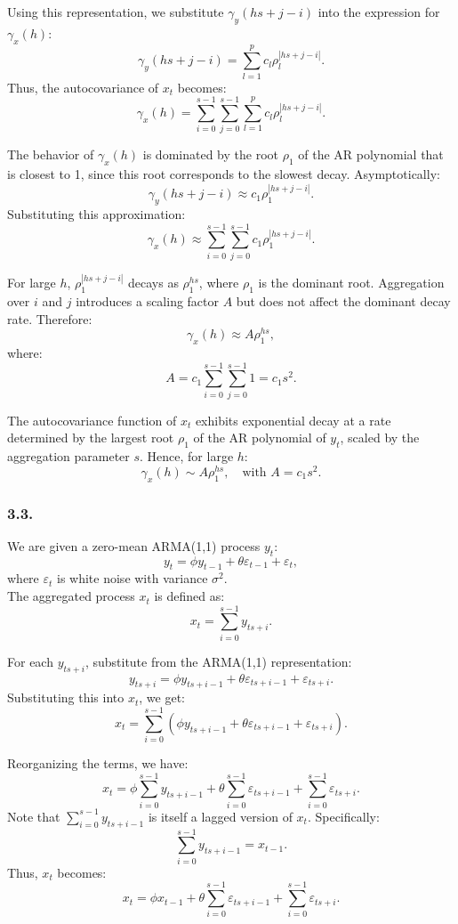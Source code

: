 \documentclass{article}
\begin{document}
Using this representation, we substitute \( \gamma_y(hs + j - i) \) into the expression for \( \gamma_x(h) \):
\[
\gamma_y(hs + j - i) = \sum_{l=1}^p c_l \rho_l^{|hs + j - i|}.
\]
Thus, the autocovariance of \( x_t \) becomes:
\[
\gamma_x(h) = \sum_{i=0}^{s-1}\sum_{j=0}^{s-1} \sum_{l=1}^p c_l \rho_l^{|hs + j - i|}.
\]


The behavior of \( \gamma_x(h) \) is dominated by the root \( \rho_1 \) of the AR polynomial that is closest to 1, since this root corresponds to the slowest decay. Asymptotically:
\[
\gamma_y(hs + j - i) \approx c_1 \rho_1^{|hs + j - i|}.
\]
Substituting this approximation:
\[
\gamma_x(h) \approx \sum_{i=0}^{s-1}\sum_{j=0}^{s-1} c_1 \rho_1^{|hs + j - i|}.
\]

For large \( h \), \( \rho_1^{|hs + j - i|} \) decays as \( \rho_1^{hs} \), where \( \rho_1 \) is the dominant root. Aggregation over \( i \) and \( j \) introduces a scaling factor \( A \) but does not affect the dominant decay rate. Therefore:
\[
\gamma_x(h) \approx A \rho_1^{hs},
\]
where:
\[
A = c_1 \sum_{i=0}^{s-1}\sum_{j=0}^{s-1} 1 = c_1 s^2.
\]

The autocovariance function of \( x_t \) exhibits exponential decay at a rate determined by the largest root \( \rho_1 \) of the AR polynomial of \( y_t \), scaled by the aggregation parameter \( s \). Hence, for large \( h \):
\[
\gamma_x(h) \sim A \rho_1^{hs}, \quad \text{with } A = c_1 s^2.
\]


\subsubsection*{3.3.}

We are given a zero-mean ARMA(1,1) process \( y_t \):
\[
y_t = \phi y_{t-1} + \theta \varepsilon_{t-1} + \varepsilon_t,
\]
where \( \varepsilon_t \) is white noise with variance \( \sigma^2 \). \\

The aggregated process \( x_t \) is defined as:
\[
x_t = \sum_{i=0}^{s-1} y_{ts+i}.
\]

For each \( y_{ts+i} \), substitute from the ARMA(1,1) representation:
\[
y_{ts+i} = \phi y_{ts+i-1} + \theta \varepsilon_{ts+i-1} + \varepsilon_{ts+i}.
\]
Substituting this into \( x_t \), we get:
\[
x_t = \sum_{i=0}^{s-1} \left( \phi y_{ts+i-1} + \theta \varepsilon_{ts+i-1} + \varepsilon_{ts+i} \right).
\]

Reorganizing the terms, we have:
\[
x_t = \phi \sum_{i=0}^{s-1} y_{ts+i-1} + \theta \sum_{i=0}^{s-1} \varepsilon_{ts+i-1} + \sum_{i=0}^{s-1} \varepsilon_{ts+i}.
\]
Note that \( \sum_{i=0}^{s-1} y_{ts+i-1} \) is itself a lagged version of \( x_t \). Specifically:
\[
\sum_{i=0}^{s-1} y_{ts+i-1} = x_{t-1}.
\]
Thus, \( x_t \) becomes:
\[
x_t = \phi x_{t-1} + \theta \sum_{i=0}^{s-1} \varepsilon_{ts+i-1} + \sum_{i=0}^{s-1} \varepsilon_{ts+i}.
\]
\end{document}
